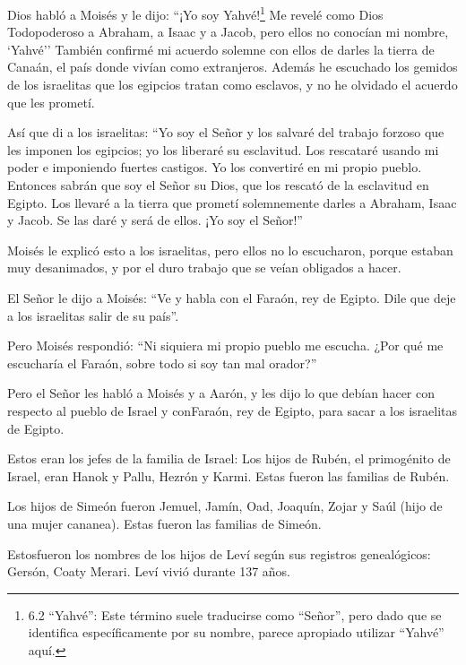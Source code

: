 Dios habló a Moisés y le dijo: ``¡Yo soy Yahvé!\footnote{6.2
  ``Yahvé'': Este término suele traducirse como ``Señor'', pero dado que
  se identifica específicamente por su nombre, parece apropiado utilizar
  ``Yahvé'' aquí.}  Me revelé como Dios Todopoderoso a
Abraham, a Isaac y a Jacob, pero ellos no conocían mi nombre, `Yahvé''
 También confirmé mi acuerdo solemne con ellos de darles la
tierra de Canaán, el país donde vivían como extranjeros. 
Además he escuchado los gemidos de los israelitas que los egipcios
tratan como esclavos, y no he olvidado el acuerdo que les prometí.

 Así que di a los israelitas: ``Yo soy el Señor y los
salvaré del trabajo forzoso que les imponen los egipcios; yo los
liberaré su esclavitud. Los rescataré usando mi poder e imponiendo
fuertes castigos.  Yo los convertiré en mi propio pueblo.
Entonces sabrán que soy el Señor su Dios, que los rescató de la
esclavitud en Egipto.  Los llevaré a la tierra que prometí
solemnemente darles a Abraham, Isaac y Jacob. Se las daré y será de
ellos. ¡Yo soy el Señor!''

 Moisés le explicó esto a los israelitas, pero ellos no lo
escucharon, porque estaban muy desanimados, y por el duro trabajo que se
veían obligados a hacer.

 El Señor le dijo a Moisés:  ``Ve y habla con
el Faraón, rey de Egipto. Dile que deje a los israelitas salir de su
país''.

 Pero Moisés respondió: ``Ni siquiera mi propio pueblo me
escucha. ¿Por qué me escucharía el Faraón, sobre todo si soy tan mal
orador?''

 Pero el Señor les habló a Moisés y a Aarón, y les dijo lo
que debían hacer con respecto al pueblo de Israel y conFaraón, rey de
Egipto, para sacar a los israelitas de Egipto.

 Estos eran los jefes de la familia de Israel: Los hijos de
Rubén, el primogénito de Israel, eran Hanok y Pallu, Hezrón y Karmi.
Estas fueron las familias de Rubén.

 Los hijos de Simeón fueron Jemuel, Jamín, Oad, Joaquín,
Zojar y Saúl (hijo de una mujer cananea). Estas fueron las familias de
Simeón.

 Estosfueron los nombres de los hijos de Leví según sus
registros genealógicos: Gersón, Coaty Merari. Leví vivió durante 137
años.

